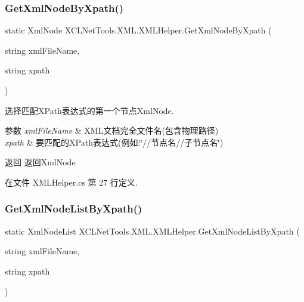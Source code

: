 \subsubsection{\texorpdfstring{Get\+Xml\+Node\+By\+Xpath()}{GetXmlNodeByXpath()}}
{\footnotesize\ttfamily static Xml\+Node X\+C\+L\+Net\+Tools.\+X\+M\+L.\+X\+M\+L\+Helper.\+Get\+Xml\+Node\+By\+Xpath (\begin{DoxyParamCaption}\item[{string}]{xml\+File\+Name,  }\item[{string}]{xpath }\end{DoxyParamCaption})\hspace{0.3cm}{\ttfamily [static]}}



选择匹配\+X\+Path表达式的第一个节点\+Xml\+Node. 


\begin{DoxyParams}{参数}
{\em xml\+File\+Name} & X\+M\+L文档完全文件名(包含物理路径)\\
\hline
{\em xpath} & 要匹配的\+X\+Path表达式(例如\+:\char`\"{}//节点名//子节点名\char`\"{})\\
\hline
\end{DoxyParams}
\begin{DoxyReturn}{返回}
返回\+Xml\+Node
\end{DoxyReturn}


在文件 X\+M\+L\+Helper.\+cs 第 27 行定义.

\mbox{\label{class_x_c_l_net_tools_1_1_x_m_l_1_1_x_m_l_helper_a76ff3ba97f764e08467ac33ab90eac14}} 
\subsubsection{\texorpdfstring{Get\+Xml\+Node\+List\+By\+Xpath()}{GetXmlNodeListByXpath()}}
{\footnotesize\ttfamily static Xml\+Node\+List X\+C\+L\+Net\+Tools.\+X\+M\+L.\+X\+M\+L\+Helper.\+Get\+Xml\+Node\+List\+By\+Xpath (\begin{DoxyParamCaption}\item[{string}]{xml\+File\+Name,  }\item[{string}]{xpath }\end{DoxyParamCaption})\hspace{0.3cm}{\ttfamily [static]}}



